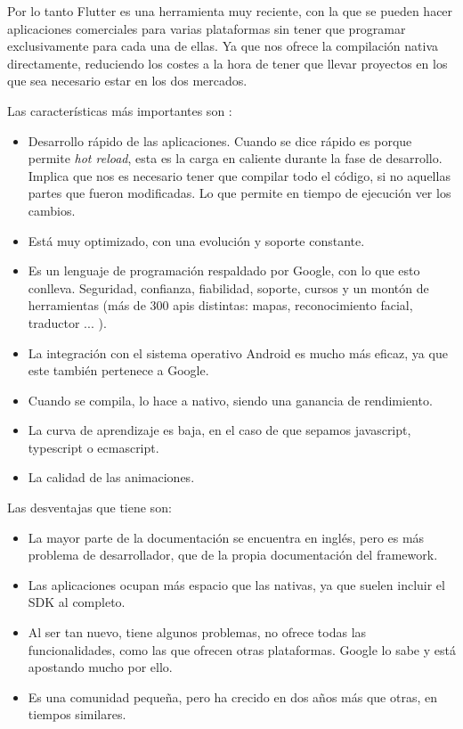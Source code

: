 Por lo tanto Flutter es una herramienta muy reciente, con la que se pueden hacer aplicaciones comerciales para varias plataformas sin tener que programar exclusivamente para cada una de ellas. Ya que nos ofrece la compilación nativa directamente, reduciendo los costes a la hora de tener que llevar proyectos en los que sea necesario estar en los dos mercados.

Las características más importantes son : 

\begin{itemize}
	\item Desarrollo rápido de las aplicaciones. Cuando se dice rápido es porque permite \emph{hot reload}, esta es la carga en caliente durante la fase de desarrollo. Implica que nos es necesario tener que compilar todo el código, si no aquellas partes que fueron modificadas. Lo que permite en tiempo de ejecución ver los cambios.
	\item Está muy optimizado, con una evolución y soporte constante.
	\item Es un lenguaje de programación respaldado por Google, con lo que esto conlleva. Seguridad, confianza, fiabilidad, soporte, cursos y un montón de herramientas (más de 300 apis distintas: mapas, reconocimiento facial, traductor ... ).
	\item La integración con el sistema operativo Android es mucho más eficaz, ya que este también pertenece a Google.
	\item Cuando se compila, lo hace a nativo, siendo una ganancia de rendimiento.
	\item La curva de aprendizaje es baja, en el caso de que sepamos javascript, typescript o ecmascript.
	\item La calidad de las animaciones.
\end{itemize}

Las desventajas que tiene son:
\begin{itemize}
	\item La mayor parte de la documentación se encuentra en inglés, pero es más problema de desarrollador, que de la propia documentación del framework.
	\item Las aplicaciones ocupan más espacio que las nativas, ya que suelen incluir el SDK al completo.
	\item Al ser tan nuevo, tiene algunos problemas, no ofrece todas las funcionalidades, como las que ofrecen otras plataformas. Google lo sabe y está apostando mucho por ello.
	\item Es una comunidad pequeña, pero ha crecido en dos años más que otras, en tiempos similares.
\end{itemize}

